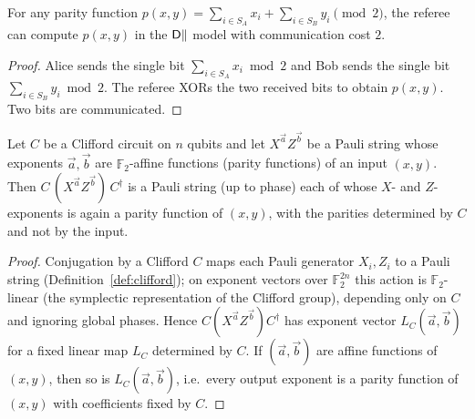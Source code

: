 \begin{lemma}
  \label{lem:parity-dpar}
  For any parity function $p(x,y) = \sum_{i\in S_A} x_i + \sum_{i\in S_B} y_i
  \pmod 2$, the referee can compute $p(x,y)$ in the $\mathsf{D}\|$ model with
  communication cost $2$.
\end{lemma}
\begin{proof}
  Alice sends the single bit $\sum_{i\in S_A} x_i \bmod 2$ and Bob sends the
  single bit $\sum_{i\in S_B} y_i \bmod 2$. The referee XORs the two received
  bits to obtain $p(x,y)$. Two bits are communicated.
\end{proof}

\begin{lemma}
  \label{lem:pauli-parity}
  Let $C$ be a Clifford circuit on $n$ qubits and let $X^{\vec a}Z^{\vec b}$ be a
  Pauli string whose exponents $\vec a,\vec b$ are $\mathbb{F}_2$-affine functions
  (parity functions) of an input $(x,y)$. Then $C\,(X^{\vec a}Z^{\vec b})\,
  C^\dagger$ is a Pauli string (up to phase) each of whose $X$- and $Z$-exponents
  is again a parity function of $(x,y)$, with the parities determined by $C$ and
  not by the input.
\end{lemma}
\begin{proof}
  Conjugation by a Clifford $C$ maps each Pauli generator $X_i, Z_i$ to a Pauli
  string (Definition~\ref{def:clifford}); on exponent vectors over
  $\mathbb{F}_2^{2n}$ this action is $\mathbb{F}_2$-linear (the symplectic
  representation of the Clifford group), depending only on $C$ and ignoring
  global phases. Hence $C(X^{\vec a}Z^{\vec b})C^\dagger$ has exponent vector
  $L_C(\vec a, \vec b)$ for a fixed linear map $L_C$ determined by $C$. If
  $(\vec a,\vec b)$ are affine functions of $(x,y)$, then so is
  $L_C(\vec a,\vec b)$, i.e.\ every output exponent is a parity function of
  $(x,y)$ with coefficients fixed by $C$.
\end{proof}

